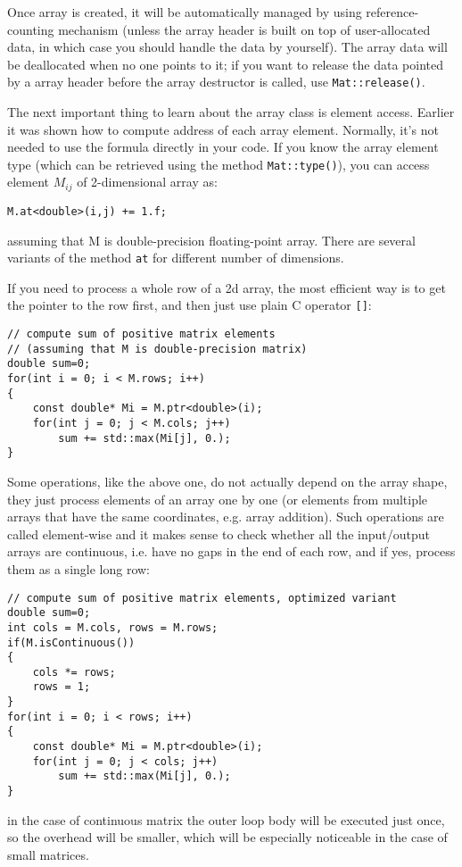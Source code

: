 Once array is created, it will be automatically managed by using reference-counting mechanism (unless the array header is built on top of user-allocated data, in which case you should handle the data by yourself).
The array data will be deallocated when no one points to it; if you want to release the data pointed by a array header before the array destructor is called, use \texttt{Mat::release()}.

The next important thing to learn about the array class is element access. Earlier it was shown how to compute address of each array element. Normally, it's not needed to use the formula directly in your code. If you know the array element type (which can be retrieved using the method \texttt{Mat::type()}), you can access element  $M_{ij}$ of 2-dimensional array as:

\begin{lstlisting}
M.at<double>(i,j) += 1.f;
\end{lstlisting}

assuming that M is double-precision floating-point array. There are several variants of the method \texttt{at} for different number of dimensions.

If you need to process a whole row of a 2d array, the most efficient way is to get the pointer to the row first, and then just use plain C operator \texttt{[]}:

\begin{lstlisting}
// compute sum of positive matrix elements
// (assuming that M is double-precision matrix)
double sum=0;
for(int i = 0; i < M.rows; i++)
{
    const double* Mi = M.ptr<double>(i);
    for(int j = 0; j < M.cols; j++)
        sum += std::max(Mi[j], 0.);
}
\end{lstlisting}

Some operations, like the above one, do not actually depend on the array shape, they just process elements of an array one by one (or elements from multiple arrays that have the same coordinates, e.g. array addition). Such operations are called element-wise and it makes sense to check whether all the input/output arrays are continuous, i.e. have no gaps in the end of each row, and if yes, process them as a single long row:

\begin{lstlisting}
// compute sum of positive matrix elements, optimized variant
double sum=0;
int cols = M.cols, rows = M.rows;
if(M.isContinuous())
{
    cols *= rows;
    rows = 1;
}
for(int i = 0; i < rows; i++)
{
    const double* Mi = M.ptr<double>(i);
    for(int j = 0; j < cols; j++)
        sum += std::max(Mi[j], 0.);
}
\end{lstlisting}
in the case of continuous matrix the outer loop body will be executed just once, so the overhead will be smaller, which will be especially noticeable in the case of small matrices.

